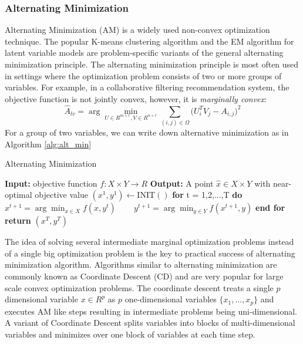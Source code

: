 \subsubsection{Alternating Minimization}

Alternating Minimization (AM) is a widely used non-convex optimization technique. The popular K-means clustering algorithm and the EM algorithm for latent variable models are problem-specific variants of the general alternating minimization principle. The alternating minimization principle is most often used in settings where the optimization problem consists of two or more groups of variables. For example, in a collaborative filtering recommendation system, the objective function is not jointly convex, however, it is \textit{marginally convex}:
\begin{equation}
    \hat{A}_{lv} = \arg \min_{U \in R^{m\times r}, V \in R^{n\times r}} \sum_{(i,j)\in \Omega}\big(U_{i}^{T}V_{j} - A_{i,j}\big)^{2}
\end{equation}
For a group of two variables, we can write down alternative minimization as in Algorithm \ref{alg:alt_min}
\begin{algorithm}
\caption{Alternating Minimization}
\label{alg:alt_min}
\begin{algorithmic}[1]
\STATE \textbf{Input:} objective function $f: X \times Y \rightarrow R$
\STATE \textbf{Output:} A point $\hat{x} \in X \times Y$ with near-optimal objective value
\STATE $(x^{1}, y^{1}) \leftarrow \mathrm{INIT}()$
\STATE \textbf{for} t = 1,2,...,T \textbf{do}
\STATE ~~~ $x^{t+1} = \arg \min_{x \in X} f(x, y^t)$
\STATE ~~~ $y^{t+1} = \arg \min_{y \in Y} f(x^{t+1}, y)$
\STATE \textbf{end for}
\STATE \textbf{return} $(x^{T}, y^{T})$
\end{algorithmic}
\end{algorithm}

The idea of solving several intermediate marginal optimization problems instead of a single big optimization problem is the key to practical success of alternating minimization algorithm. Algorithms similar to alternating minimization are commonly known as Coordinate Descent (CD) and are very popular for large scale convex optimization problems. The coordinate descent treats a single $p$ dimensional variable $x \in R^{p}$ as $p$ one-dimensional variables $\{x_1,...,x_p\}$ and executes AM like steps resulting in intermediate problems being uni-dimensional. A variant of Coordinate Descent splits variables into blocks of multi-dimensional variables and minimizes over one block of variables at each time step. 

